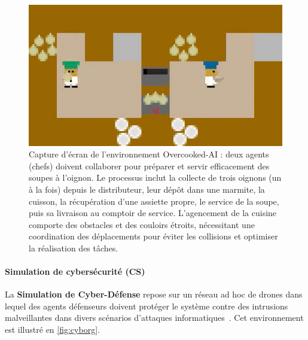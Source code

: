 \begin{figure}[h!]
    \centering
    \includegraphics[width=0.6\linewidth]{figures/overcooked.png}
    \caption{Capture d'écran de l'environnement Overcooked-AI : deux agents (chefs) doivent collaborer pour préparer et servir efficacement des soupes à l'oignon. Le processus inclut la collecte de trois oignons (un à la fois) depuis le distributeur, leur dépôt dans une marmite, la cuisson, la récupération d'une assiette propre, le service de la soupe, puis sa livraison au comptoir de service. L'agencement de la cuisine comporte des obstacles et des couloirs étroits, nécessitant une coordination des déplacements pour éviter les collisions et optimiser la réalisation des tâches.}
    \label{fig:overcooked}
\end{figure}

\paragraph{Simulation de cybersécurité (CS)}

La \textbf{Simulation de Cyber-Défense} repose sur un réseau ad hoc de drones dans lequel des agents défenseurs doivent protéger le système contre des intrusions malveillantes dans divers scénarios d'attaques informatiques~\cite{Maxwell2021}. Cet environnement est illustré en \autoref{fig:cyborg}.


